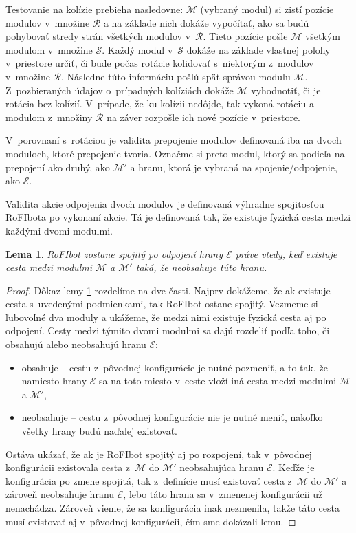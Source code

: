 \documentclass[
  printed, %
  oneside, %
  notable,   %
  nolof,     %
  nolot,     %
]{fithesis3}
\newtheorem{lemma}{Lema}
\begin{document}
Testovanie na kolízie prebieha nasledovne: $\mathcal{M}$ (vybraný modul) si zistí pozície modulov v~množine $\mathcal{R}$ a na základe nich dokáže vypočítať, ako sa budú pohybovať stredy strán všetkých modulov v~$\mathcal{R}$. Tieto pozície pošle $\mathcal{M}$ všetkým modulom v~množine $\mathcal{S}$. Každý modul v~$\mathcal{S}$ dokáže na základe vlastnej polohy v~priestore určiť, či bude počas rotácie kolidovať s~niektorým z~modulov v~množine $\mathcal{R}$. Následne túto informáciu pošlú späť správou modulu $\mathcal{M}$. Z~pozbieraných údajov o~prípadných kolíziách dokáže $\mathcal{M}$ vyhodnotiť, či je rotácia bez kolízií. V~prípade, že ku kolízii nedôjde, tak vykoná rotáciu a modulom z~množiny $\mathcal{R}$ na záver rozpošle ich nové pozície v~priestore. 

V~porovnaní s~rotáciou je validita prepojenie modulov definovaná iba na dvoch moduloch, ktoré prepojenie tvoria. Označme si preto modul, ktorý sa podieľa na prepojení ako druhý, ako $\mathcal{M}'$ a hranu, ktorá je vybraná na spojenie/odpojenie, ako $\mathcal{E}$. 

Validita akcie odpojenia dvoch modulov je definovaná výhradne spojitosťou RoFIbota po vykonaní akcie. Tá je definovaná tak, že existuje fyzická cesta medzi každými dvomi modulmi. 

\begin{lemma}
\label{lemma:disconnection}
RoFIbot zostane spojitý po odpojení hrany $\mathcal{E}$ práve vtedy, keď existuje cesta medzi modulmi $\mathcal{M}$ a $\mathcal{M}'$ taká, že neobsahuje túto hranu. 
\end{lemma}

\begin{proof}
Dôkaz lemy \ref{lemma:disconnection} rozdelíme na dve časti. Najprv dokážeme, že ak existuje cesta s~uvedenými podmienkami, tak RoFIbot ostane spojitý. Vezmeme si ľubovoľné dva moduly a ukážeme, že medzi nimi existuje fyzická cesta aj po odpojení. Cesty medzi týmito dvomi modulmi sa dajú rozdeliť podľa toho, či obsahujú alebo neobsahujú hranu $\mathcal{E}$: 
\begin{itemize}
    \item obsahuje -- cestu z~pôvodnej konfigurácie je nutné pozmeniť, a to tak, že namiesto hrany $\mathcal{E}$ sa na toto miesto v~ceste vloží iná cesta medzi modulmi $\mathcal{M}$ a $\mathcal{M}'$, 
    \item neobsahuje -- cestu z~pôvodnej konfigurácie nie je nutné meniť, nakoľko všetky hrany budú naďalej existovať.
\end{itemize}

Ostáva ukázať, že ak je RoFIbot spojitý aj po rozpojení, tak v~pôvodnej konfigurácii existovala cesta z~$\mathcal{M}$ do $\mathcal{M}'$ neobsahujúca hranu $\mathcal{E}$. Keďže je konfigurácia po zmene spojitá, tak z~definície musí existovať cesta z~$\mathcal{M}$ do $\mathcal{M}'$ a zároveň neobsahuje hranu $\mathcal{E}$, lebo táto hrana sa v~zmenenej konfigurácii už nenachádza. Zároveň vieme, že sa konfigurácia inak nezmenila, takže táto cesta musí existovať aj v~pôvodnej konfigurácii, čím sme dokázali lemu. 

\end{proof}
\end{document}
